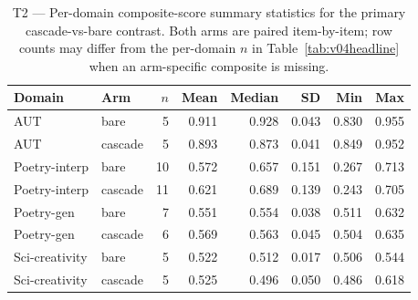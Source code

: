 \begin{table}[ht]
\centering
\caption{T2 --- Per-domain composite-score summary statistics for the primary cascade-vs-bare contrast. Both arms are paired item-by-item; row counts may differ from the per-domain $n$ in Table~\ref{tab:v04headline} when an arm-specific composite is missing.}
\label{tab:per_domain_raw}
\begin{tabular}{llrrrrrr}
\toprule
Domain & Arm & $n$ & Mean & Median & SD & Min & Max \\
\midrule
  AUT & bare & 5 & 0.911 & 0.928 & 0.043 & 0.830 & 0.955 \\
  AUT & cascade & 5 & 0.893 & 0.873 & 0.041 & 0.849 & 0.952 \\
  Poetry-interp & bare & 10 & 0.572 & 0.657 & 0.151 & 0.267 & 0.713 \\
  Poetry-interp & cascade & 11 & 0.621 & 0.689 & 0.139 & 0.243 & 0.705 \\
  Poetry-gen & bare & 7 & 0.551 & 0.554 & 0.038 & 0.511 & 0.632 \\
  Poetry-gen & cascade & 6 & 0.569 & 0.563 & 0.045 & 0.504 & 0.635 \\
  Sci-creativity & bare & 5 & 0.522 & 0.512 & 0.017 & 0.506 & 0.544 \\
  Sci-creativity & cascade & 5 & 0.525 & 0.496 & 0.050 & 0.486 & 0.618 \\
\bottomrule
\end{tabular}
\end{table}
